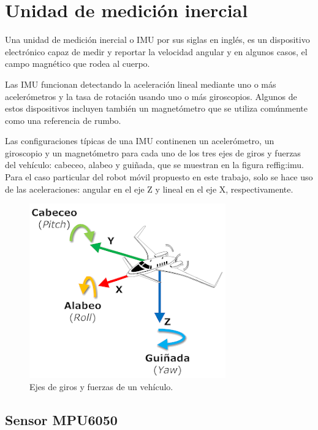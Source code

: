 \section{Unidad de medición inercial}

Una unidad de medición inercial o IMU por sus siglas en inglés, es un dispositivo electrónico capaz de medir y reportar la velocidad angular y en algunos casos, el campo magnético que rodea al cuerpo.

Las IMU funcionan detectando la aceleración lineal mediante uno o más acelerómetros y la tasa de rotación usando uno o más giroscopios. Algunos de estos dispositivos incluyen también un magnetómetro que se utiliza comúnmente como una referencia de rumbo.

Las configuraciones típicas de una IMU continenen un acelerómetro, un giroscopio y un magnetómetro para cada uno de los tres ejes de giros y fuerzas del vehículo: cabeceo, alabeo y guiñada, que se muestran en la figura ref{fig:imu}. Para el caso particular del robot móvil propuesto en este trabajo, solo se hace uso de las aceleraciones: angular en el eje Z y lineal en el eje X, respectivamente.

\begin{figure}[ht]
    \centering
    \includegraphics[scale=1.5]{./Figures/imu.png}
    \caption{Ejes de giros y fuerzas de un vehículo.\protect\footnotemark}
    \label{fig:depthMap}
\end{figure}


\subsection{Sensor MPU6050}\label{sec:mpu6050}

